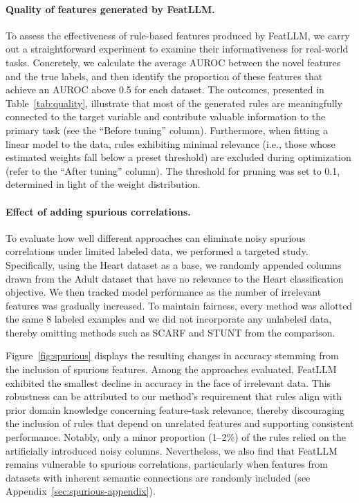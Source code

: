 \vspace*{-0.12in}
\paragraph{Quality of features generated by \textsf{FeatLLM}.}
To assess the effectiveness of rule-based features produced by \textsf{FeatLLM}, we carry out a straightforward experiment to examine their informativeness for real-world tasks. Concretely, we calculate the average AUROC between the novel features and the true labels, and then identify the proportion of these features that achieve an AUROC above 0.5 for each dataset. The outcomes, presented in Table~\ref{tab:quality}, illustrate that most of the generated rules are meaningfully connected to the target variable and contribute valuable information to the primary task (see the “Before tuning” column). Furthermore, when fitting a linear model to the data, rules exhibiting minimal relevance (i.e., those whose estimated weights fall below a preset threshold) are excluded during optimization (refer to the “After tuning” column). The threshold for pruning was set to 0.1, determined in light of the weight distribution.

\vspace*{-0.12in}
\paragraph{Effect of adding spurious correlations.} To evaluate how well different approaches can eliminate noisy spurious correlations under limited labeled data, we performed a targeted study. Specifically, using the Heart dataset as a base, we randomly appended columns drawn from the Adult dataset that have no relevance to the Heart classification objective. We then tracked model performance as the number of irrelevant features was gradually increased. To maintain fairness, every method was allotted the same 8 labeled examples and we did not incorporate any unlabeled data, thereby omitting methods such as SCARF and STUNT from the comparison.

Figure~\ref{fig:spurious} displays the resulting changes in accuracy stemming from the inclusion of spurious features. Among the approaches evaluated, \textsf{FeatLLM} exhibited the smallest decline in accuracy in the face of irrelevant data. This robustness can be attributed to our method’s requirement that rules align with prior domain knowledge concerning feature-task relevance, thereby discouraging the inclusion of rules that depend on unrelated features and supporting consistent performance. Notably, only a minor proportion (1–2\%) of the rules relied on the artificially introduced noisy columns. Nevertheless, we also find that \textsf{FeatLLM} remains vulnerable to spurious correlations, particularly when features from datasets with inherent semantic connections are randomly included (see Appendix~\ref{sec:spurious-appendix}).

